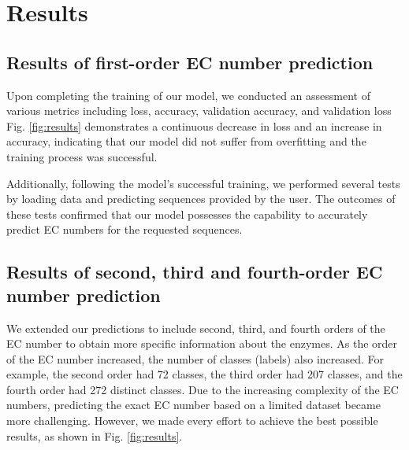 \documentclass[conference]{IEEEtran}
\begin{document}
\section{Results}

\subsection{Results of first-order EC number prediction}

Upon completing the training of our model, we conducted an assessment of various
metrics including loss, accuracy, validation accuracy, and validation loss Fig. \ref{fig:results} demonstrates a continuous decrease in loss and an increase in accuracy, indicating that our
model did not suffer from overfitting and the training process was successful.

Additionally, following the model’s successful training, we performed several tests by
loading data and predicting sequences provided by the user. The outcomes of these tests
confirmed that our model possesses the capability to accurately predict EC numbers for
the requested sequences.

\subsection{Results of second, third and fourth-order EC number prediction}

We extended our predictions to include second, third, and fourth orders of the EC number
to obtain more specific information about the enzymes. As the order of the EC number
increased, the number of classes (labels) also increased. For example, the second order
had 72 classes, the third order had 207 classes, and the fourth order had 272 distinct
classes. Due to the increasing complexity of the EC numbers, predicting the exact EC
number based on a limited dataset became more challenging. However, we made every
effort to achieve the best possible results, as shown in Fig. \ref{fig:results}.

\onecolumn
\end{document}
